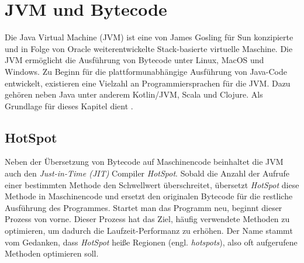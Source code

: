 \chapter{JVM und Bytecode}
\label{cha:jvm}

Die Java Virtual Machine (JVM) ist eine von James Gosling für Sun konzipierte und in Folge von Oracle weiterentwickelte Stack-basierte virtuelle Maschine. Die JVM ermöglicht die Ausführung von Bytecode unter Linux, MacOS und Windows. Zu Beginn für die plattformunabhängige Ausführung von Java-Code entwickelt, existieren eine Vielzahl an Programmiersprachen für die JVM. Dazu gehören neben Java unter anderem Kotlin/JVM, Scala und Clojure.
Als Grundlage für dieses Kapitel dient \textcite{lindholm2016java}.

\section{HotSpot}

Neben der Übersetzung von Bytecode auf Maschinencode beinhaltet die JVM auch den \textit{Just-in-Time (JIT)} Compiler \textit{HotSpot}. Sobald die Anzahl der Aufrufe einer bestimmten Methode den Schwellwert überschreitet, übersetzt \textit{HotSpot} diese Methode in Maschinencode und ersetzt den originalen Bytecode für die restliche Ausführung des Programmes. Startet man das Programm neu, beginnt dieser Prozess von vorne. Dieser Prozess hat das Ziel, häufig verwendete Methoden zu optimieren, um dadurch die Laufzeit-Performanz zu erhöhen. Der Name stammt vom Gedanken, dass \textit{HotSpot} heiße Regionen (engl. \textit{hotspots}), also oft aufgerufene Methoden optimieren soll.

